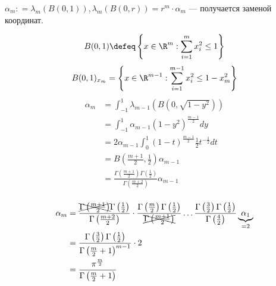 \begin{example}
    \(\alpha_m : = \lambda_m(B(0, 1)), \lambda_m(B(0, r)) = r^m \cdot \alpha_m\) --- получается заменой координат.

    \[B(0, 1) \defeq \left\{x\in \R^m : \sum_{i = 1}^m x_i^2 \leq 1\right\} \]
    \[B(0, 1)_{x_m} = \left\{x\in \R^{m - 1} : \sum_{i = 1}^{m - 1} x_i^2 \leq 1 - x_m^2 \right\}\]
    \begin{align*}
        \alpha_m
         & = \int_{ - 1}^{1} \lambda_{m - 1} \left(B\left( 0, \sqrt{1 - y^2} \right)\right)                                                   \\
         & = \int_{ - 1}^{1} \alpha_{m - 1} (1 - y^2)^{\frac{m - 1}{2}} dy                                                                    \\
         & = 2\alpha_{m - 1} \int_{0}^{1} (1 - t)^{\frac{m - 1}{2}} \frac{1}{2} t^{ - \frac{1}{2}} dt                                         \\
         & = B\left(\frac{m + 1}{2}, \frac{1}{2}\right) \alpha_{m - 1}                                                                        \\
         & = \frac{\Gamma\left( \frac{m + 1}{2} \right)\Gamma\left( \frac{1}{2} \right)}{\Gamma\left( \frac{m + 2}{2} \right)} \alpha_{m - 1} \\
    \end{align*}

    \begin{align*}
        \alpha_m & = \frac{\xcancel{\Gamma\left( \frac{m + 1}{2} \right)}\Gamma\left( \frac{1}{2} \right)}{\Gamma\left( \frac{m + 2}{2} \right)} \cdot \frac{\Gamma\left( \frac{m}{2} \right)\Gamma\left( \frac{1}{2} \right)}{\xcancel{\Gamma\left( \frac{m + 1}{2} \right)}} \dots \frac{\Gamma\left( \frac{3}{2} \right)\Gamma\left( \frac{1}{2} \right)}{\Gamma\left( \frac{4}{2} \right)} \underbrace{\alpha_1}_{ = 2} \\
                 & = \frac{\Gamma\left( \frac{3}{2} \right)\Gamma\left( \frac{1}{2} \right)}{\Gamma\left( \frac{m}{2} + 1 \right)^{m - 1}} \cdot 2                                                                                                                                                                                                                                                                          \\
                 & = \frac{\pi^{\frac{m}{2}}}{\Gamma\left( \frac{m}{2} + 1 \right)}
    \end{align*}


\end{example}
